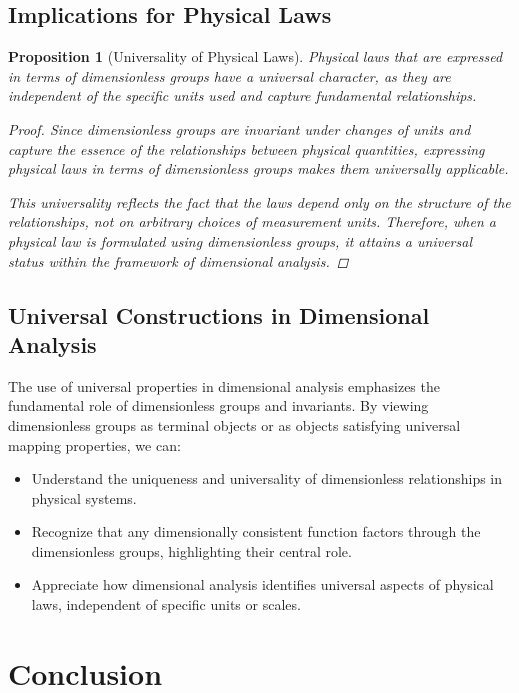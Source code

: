\documentclass{article}
\newtheorem{proposition}{Proposition}[section]
\theoremstyle{definition}
\theoremstyle{remark}
\begin{document}
	\subsection{Implications for Physical Laws}
	
	\begin{proposition}[Universality of Physical Laws]
		Physical laws that are expressed in terms of dimensionless groups have a universal character, as they are independent of the specific units used and capture fundamental relationships.
		
		\begin{proof}
			Since dimensionless groups are invariant under changes of units and capture the essence of the relationships between physical quantities, expressing physical laws in terms of dimensionless groups makes them universally applicable.
			
			This universality reflects the fact that the laws depend only on the structure of the relationships, not on arbitrary choices of measurement units. Therefore, when a physical law is formulated using dimensionless groups, it attains a universal status within the framework of dimensional analysis.
		\end{proof}
	\end{proposition}
	
	\subsection{Universal Constructions in Dimensional Analysis}
	
	The use of universal properties in dimensional analysis emphasizes the fundamental role of dimensionless groups and invariants. By viewing dimensionless groups as terminal objects or as objects satisfying universal mapping properties, we can:
	
	\begin{itemize}
		\item Understand the uniqueness and universality of dimensionless relationships in physical systems.
		\item Recognize that any dimensionally consistent function factors through the dimensionless groups, highlighting their central role.
		\item Appreciate how dimensional analysis identifies universal aspects of physical laws, independent of specific units or scales.
	\end{itemize}
	
	\section{Conclusion}
	
\end{document}

